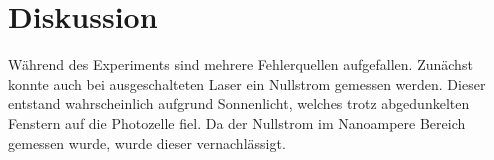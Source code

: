 \section{Diskussion}
\label{sec:Diskussion}

Während des Experiments sind mehrere Fehlerquellen aufgefallen. Zunächst konnte auch bei ausgeschalteten Laser ein Nullstrom gemessen werden. Dieser entstand wahrscheinlich aufgrund Sonnenlicht, welches trotz abgedunkelten Fenstern auf die Photozelle fiel.
Da der Nullstrom im Nanoampere Bereich gemessen wurde, wurde dieser vernachlässigt.
